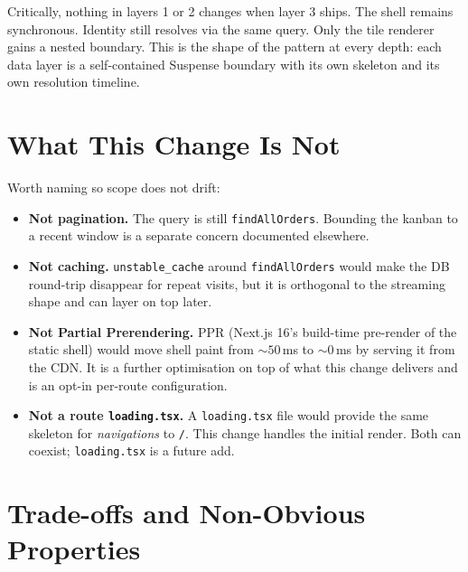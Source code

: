 \documentclass[11pt]{article}
\begin{document}
Critically, nothing in layers 1 or 2 changes when layer 3 ships. The shell remains synchronous. Identity still resolves via the same query. Only the tile renderer gains a nested boundary. This is the shape of the pattern at every depth: each data layer is a self-contained Suspense boundary with its own skeleton and its own resolution timeline.

\section{What This Change Is Not}

Worth naming so scope does not drift:

\begin{itemize}[leftmargin=1.4em, itemsep=0.15em]
  \item \textbf{Not pagination.} The query is still \texttt{findAllOrders}. Bounding the kanban to a recent window is a separate concern documented elsewhere.
  \item \textbf{Not caching.} \texttt{unstable\_cache} around \texttt{findAllOrders} would make the DB round-trip disappear for repeat visits, but it is orthogonal to the streaming shape and can layer on top later.
  \item \textbf{Not Partial Prerendering.} PPR (Next.js 16's build-time pre-render of the static shell) would move shell paint from $\sim 50$\,ms to $\sim 0$\,ms by serving it from the CDN. It is a further optimisation on top of what this change delivers and is an opt-in per-route configuration.
  \item \textbf{Not a route \texttt{loading.tsx}.} A \texttt{loading.tsx} file would provide the same skeleton for \emph{navigations} to \texttt{/}. This change handles the initial render. Both can coexist; \texttt{loading.tsx} is a future add.
\end{itemize}

\section{Trade-offs and Non-Obvious Properties}
\end{document}
